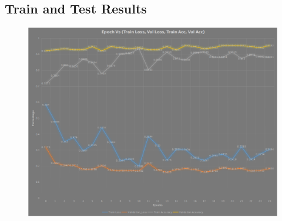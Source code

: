 \documentclass[12pt]{article}
\begin{document}
	\subsection{Train and Test Results}
	\begin{figure}[h]
		\includegraphics[width=13cm]{Plot_3.png}
		\captionsetup{justification=centering,margin=1cm}
		\label{fig:sub1}
	\end{figure}
	
\end{document}
